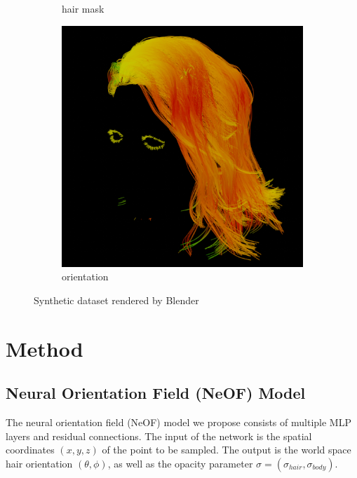 \documentclass{article}
\begin{document}
\begin{figure}[h]
\begin{subfigure}{0.11\textwidth}
		\caption{hair mask}
	\end{subfigure}
	\hfill
	\begin{subfigure}{0.11\textwidth}
        \centering
        \includegraphics[width=\textwidth]{./images/dataset/0009_hairdir.png}
        \caption{orientation}
	\end{subfigure}

	\caption{Synthetic dataset rendered by Blender}
	\label{fig:dataset}
\end{figure}

\section{Method}


\subsection{Neural Orientation Field (NeOF) Model}

The neural orientation field (NeOF) model we propose consists of multiple MLP layers and residual connections. The input of the network is the spatial coordinates $(x, y, z)$ of the point to be sampled. The output is the world space hair orientation $(\theta, \phi)$, as well as the opacity parameter $\sigma = (\sigma_{hair}, \sigma_{body})$.
\end{document}
